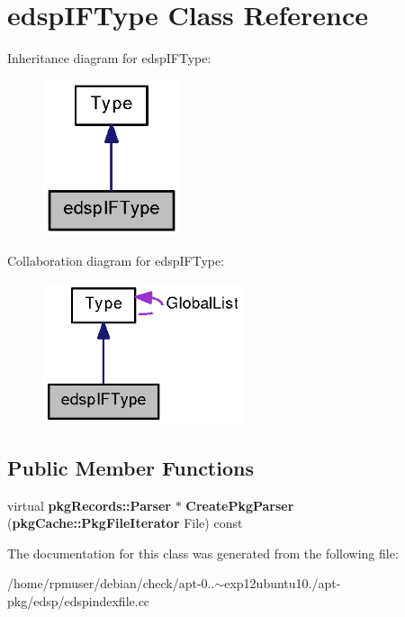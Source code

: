 \section{edsp\-I\-F\-Type \-Class \-Reference}
\label{classedspIFType}


\-Inheritance diagram for edsp\-I\-F\-Type\-:
\nopagebreak
\begin{figure}[H]
\begin{center}
\leavevmode
\includegraphics[width=114pt]{classedspIFType__inherit__graph}
\end{center}
\end{figure}


\-Collaboration diagram for edsp\-I\-F\-Type\-:
\nopagebreak
\begin{figure}[H]
\begin{center}
\leavevmode
\includegraphics[width=166pt]{classedspIFType__coll__graph}
\end{center}
\end{figure}
\subsection*{\-Public \-Member \-Functions}
\begin{DoxyCompactItemize}
\item 
virtual {\bf pkg\-Records\-::\-Parser} $\ast$ {\bfseries \-Create\-Pkg\-Parser} ({\bf pkg\-Cache\-::\-Pkg\-File\-Iterator} \-File) const \label{classedspIFType_a5c7bfcd901abdb70ec482bc768d0d7fa}

\end{DoxyCompactItemize}


\-The documentation for this class was generated from the following file\-:\begin{DoxyCompactItemize}
\item 
/home/rpmuser/debian/check/apt-\/0..$\sim$exp12ubuntu10./apt-\/pkg/edsp/edspindexfile.\-cc\end{DoxyCompactItemize}

